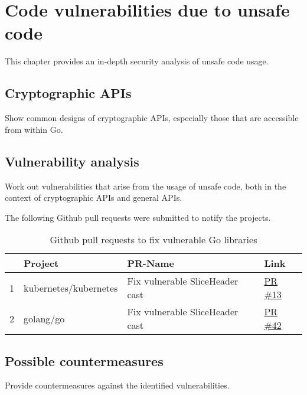 
\chapter{Code vulnerabilities due to unsafe code}\label{ch:code-vulnerabilities}

This chapter provides an in-depth security analysis of unsafe code usage.



\section{Cryptographic APIs}\label{sec:cryptographic-apis}

Show common designs of cryptographic APIs, especially those that are accessible from
within Go.



\section{Vulnerability analysis}\label{sec:vulnerability-analysis}

Work out vulnerabilities that arise from the usage of unsafe code, both in the context
of cryptographic APIs and general APIs.

The following Github pull requests were submitted to notify the projects.

\begin{table}[h]
    \centering
    \caption{Github pull requests to fix vulnerable Go libraries}
    \label{tbl:pull-requests}
    \begin{tabular}{llll}
        \toprule
        {} & Project & PR-Name & Link \\
        \midrule
        1  & kubernetes/kubernetes & Fix vulnerable SliceHeader cast & \href{https://www.github.com/kubernetes/kubernetes/pull/13}{PR \#13} \\
        2  & golang/go & Fix vulnerable SliceHeader cast & \href{https://www.github.com/golang/go/pull/42}{PR \#42} \\
        \bottomrule
    \end{tabular}
\end{table}



\section{Possible countermeasures}\label{sec:countermeasures}

Provide countermeasures against the identified vulnerabilities.
